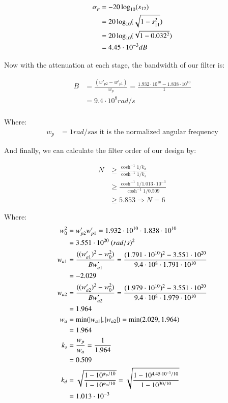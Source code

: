 \documentclass[12pt]{report} %
\begin{document}
\begin{align*}
\alpha_{p} &= - 20 \* \log_{10}(s_{12}) \\
&= \-20 \* \log_{10}(\sqrt{1 - s_{11}^2}) \\
&= \-20 \* \log_{10}(\sqrt{1 - 0.032^2}) \\
&= 4.45 \cdot 10^{-3} dB
\end{align*}

Now with the attenuation at each stage, the bandwidth of our filter is:

\begin{align*}
B &= \frac{(w'_{p2} - w'_{p1})}{w_p} = \frac{1.932 \cdot 10^{10} - 1.838 \cdot 10^{10}}{1} \\
&= 9.4 \cdot 10^{8} rad/s \\
\end{align*}

Where:
\begin{align*}
w_p &= 1 rad/s \text{as it is the normalized angular frequency}
\end{align*}

And finally, we can calculate the filter order of our design by:

\begin{align*}
N &\geq \frac{\cosh^{-1}{1/k_d}}{\cosh^{-1}{1/k_s}} \\
&\geq \frac{\cosh^{-1}{1/1.013 \cdot 10^{-3}}}{\cosh^{-1}{1/0.509}} \\
&\geq 5.853 \Rightarrow N = 6
\end{align*}

Where:
\begin{align*}
w_0^2 &= w'_{p2} \* w'_{p1} = 1.932 \cdot 10^{10} \cdot 1.838 \cdot 10^{10} \\
&= 3.551 \cdot 10^{20} \ (rad/s)^2 \\
w_{a1} &= \frac{((w'_{a1})^2 - w_{0}^2)}{B \* w'_{a1}} = \frac{(1.791 \cdot 10^{10})^2 - 3.551 \cdot 10^{20}}{9.4 \cdot 10^8 \cdot 1.791 \cdot 10^{10}} \\
&= -2.029 \\
w_{a2} &= \frac{((w'_{a2})^2 - w_{0}^2)}{B \* w'_{a2}} = \frac{(1.979 \cdot 10^{10})^2 - 3.551 \cdot 10^{20}}{9.4 \cdot 10^8 \cdot 1.979 \cdot 10^{10}} \\
&= 1.964 \\
w_a &= \min (|w_{a1} |, |w_{a2}|) = \min (2.029, 1.964) \\
&= 1.964 \\
k_s &= \frac{w_p}{w_a} = \frac{1}{1.964} \\
&= 0.509 \\
k_d &= \sqrt{\frac{1 - 10^{\alpha_p / 10}}{1 - 10^{\alpha_a / 10}}} = \sqrt{\frac{1 - 10^{4.45 \cdot 10^{-3} / 10}}{1 - 10^{30 / 10}}} \\
&= 1.013 \cdot 10^{-3}
\end{align*}
\end{document}
